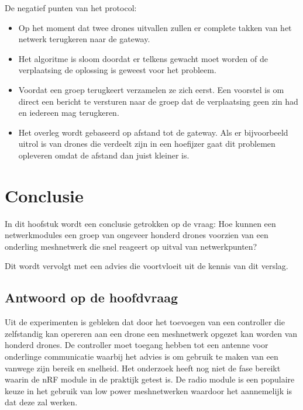 \documentclass[a4paper, 11pt, oneside]{report}
\begin{document}
De negatief punten van het protocol:
\begin{itemize}
	\item Op het moment dat twee drones uitvallen zullen er complete takken van het netwerk terugkeren naar de gateway.
	\item Het algoritme is sloom doordat er telkens gewacht moet worden of de verplaatsing de oplossing is geweest voor het probleem.
	\item Voordat een groep terugkeert verzamelen ze zich eerst. Een voorstel is om direct een bericht te versturen naar de groep dat de verplaatsing geen zin had en iedereen mag terugkeren.
	\item Het overleg wordt gebaseerd op afstand tot de gateway. Als er bijvoorbeeld uitrol is van drones die verdeelt zijn in een hoefijzer gaat dit problemen opleveren omdat de afstand dan juist kleiner is.
\end{itemize} 





\chapter{Conclusie}
\label{chapter:conclusie}
In dit hoofstuk wordt een conclusie getrokken op de vraag: Hoe kunnen een netwerkmodules een groep van ongeveer honderd drones voorzien van een onderling meshnetwerk die snel reageert op uitval van netwerkpunten?

Dit wordt vervolgt met een advies die voortvloeit uit de kennis van dit verslag.

\section{Antwoord op de hoofdvraag}

Uit de experimenten is gebleken dat door het toevoegen van een controller die zelfstandig kan opereren aan een drone een meshnetwerk opgezet kan worden van honderd drones. De controller moet toegang hebben tot een antenne voor onderlinge communicatie waarbij het advies is om gebruik te maken van een  vanwege zijn bereik en snelheid. Het onderzoek heeft nog niet de fase bereikt waarin de nRF module in de praktijk getest is. De radio module is een populaire keuze in het gebruik van low power meshnetwerken waardoor het aannemelijk is dat deze zal werken.
\end{document}
